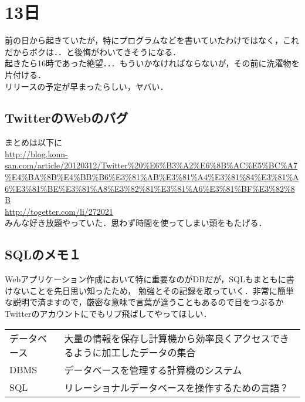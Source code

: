 \documentclass[11pt]{article}
\begin{document}
\section{13日}
\label{sec-5}

前の日から起きていたが，特にプログラムなどを書いていたわけではなく，これだからボクは．．と後悔がわいてきそうになる．\\
起きたら16時であった絶望．．．もういかなければならないが，その前に洗濯物を片付ける．\\
リリースの予定が早まったらしい，ヤバい．
\subsection{TwitterのWebのバグ}
\label{sec-5-1}

まとめは以下に\\
\href{http://blog.konn-san.com/article/20120312/Twitter%20%E6%B3%A2%E6%8B%AC%E5%BC%A7%E4%BA%8B%E4%BB%B6%E3%81%AB%E3%81%A4%E3%81%84%E3%81%A6%E3%81%BE%E3%81%A8%E3%82%81%E3%81%A6%E3%81%BF%E3%82%8B}{http://blog.konn-san.com/article/20120312/Twitter\%20\%E6\%B3\%A2\%E6\%8B\%AC\%E5\%BC\%A7\%E4\%BA\%8B\%E4\%BB\%B6\%E3\%81\%AB\%E3\%81\%A4\%E3\%81\%84\%E3\%81\%A6\%E3\%81\%BE\%E3\%81\%A8\%E3\%82\%81\%E3\%81\%A6\%E3\%81\%BF\%E3\%82\%8B}
\\
\href{http://togetter.com/li/272021}{http://togetter.com/li/272021}
\\
みんな好き放題やっていた．思わず時間を使ってしまい頭をもたげる．
\subsection{SQLのメモ１}
\label{sec-5-2}

Webアプリケーション作成において特に重要なのがDBだが，SQLもまともに書けないことを先日思い知ったため，
勉強とその記録を取っていく．非常に簡単な説明で済ますので，厳密な意味で言葉が違うこともあるので目をつぶるかTwitterのアカウントにでもリプ飛ばしてやってほしい．

\begin{center}
\begin{tabular}{ll}
\hline
 データベース  &  大量の情報を保存し計算機から効率良くアクセスできるように加工したデータの集合  \\
 DBMS          &  データベースを管理する計算機のシステム                                        \\
 SQL           &  リレーショナルデータベースを操作するための言語？                              \\
\hline
\end{tabular}
\end{center}
\end{document}
